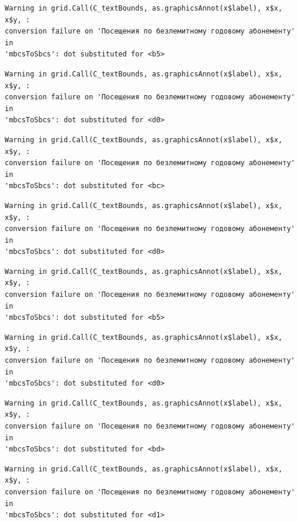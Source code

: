 \documentclass[
  letterpaper,
  DIV=11,
  numbers=noendperiod]{scrartcl}
\begin{document}
\begin{verbatim}
Warning in grid.Call(C_textBounds, as.graphicsAnnot(x$label), x$x, x$y, :
conversion failure on 'Посещения по безлемитному годовому абонементу' in
'mbcsToSbcs': dot substituted for <b5>
\end{verbatim}

\begin{verbatim}
Warning in grid.Call(C_textBounds, as.graphicsAnnot(x$label), x$x, x$y, :
conversion failure on 'Посещения по безлемитному годовому абонементу' in
'mbcsToSbcs': dot substituted for <d0>
\end{verbatim}

\begin{verbatim}
Warning in grid.Call(C_textBounds, as.graphicsAnnot(x$label), x$x, x$y, :
conversion failure on 'Посещения по безлемитному годовому абонементу' in
'mbcsToSbcs': dot substituted for <bc>
\end{verbatim}

\begin{verbatim}
Warning in grid.Call(C_textBounds, as.graphicsAnnot(x$label), x$x, x$y, :
conversion failure on 'Посещения по безлемитному годовому абонементу' in
'mbcsToSbcs': dot substituted for <d0>
\end{verbatim}

\begin{verbatim}
Warning in grid.Call(C_textBounds, as.graphicsAnnot(x$label), x$x, x$y, :
conversion failure on 'Посещения по безлемитному годовому абонементу' in
'mbcsToSbcs': dot substituted for <b5>
\end{verbatim}

\begin{verbatim}
Warning in grid.Call(C_textBounds, as.graphicsAnnot(x$label), x$x, x$y, :
conversion failure on 'Посещения по безлемитному годовому абонементу' in
'mbcsToSbcs': dot substituted for <d0>
\end{verbatim}

\begin{verbatim}
Warning in grid.Call(C_textBounds, as.graphicsAnnot(x$label), x$x, x$y, :
conversion failure on 'Посещения по безлемитному годовому абонементу' in
'mbcsToSbcs': dot substituted for <bd>
\end{verbatim}

\begin{verbatim}
Warning in grid.Call(C_textBounds, as.graphicsAnnot(x$label), x$x, x$y, :
conversion failure on 'Посещения по безлемитному годовому абонементу' in
'mbcsToSbcs': dot substituted for <d1>
\end{verbatim}
\end{document}
